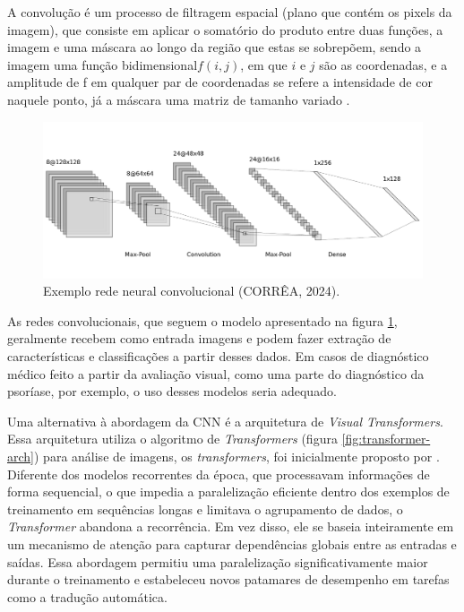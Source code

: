 A convolução é um processo de filtragem espacial (plano que contém os pixels da imagem), que consiste em aplicar o somatório do produto entre duas funções, a imagem e uma máscara ao longo da região que estas se sobrepõem, sendo a imagem uma função bidimensional\( f(i,j)\), em que \(i\) e \(j\) são as coordenadas, e a amplitude de f em qualquer par de coordenadas se refere a intensidade de cor naquele ponto, já a máscara uma matriz de tamanho variado \cite{gonzalez2008digital}. 

\begin{figure}[h]
    \centering
    \includegraphics[scale=0.3]{images/redeconv.png}
    \caption{Exemplo rede neural convolucional (CORRÊA, 2024).}
    \label{fig: cnn}
\end{figure}


As redes convolucionais, que seguem o modelo apresentado na figura \ref{fig: cnn}, geralmente recebem como entrada imagens e podem fazer extração de características e classificações a partir desses dados. Em casos de diagnóstico médico feito a partir da avaliação visual, como uma parte do diagnóstico da psoríase, por exemplo, o uso desses modelos seria adequado.

Uma alternativa à abordagem da \acs{CNN} é a arquitetura de \textit{Visual Transformers}. Essa arquitetura utiliza o algoritmo de \textit{Transformers} (figura \ref{fig:transformer-arch}) para análise de imagens, os \textit{transformers}, foi inicialmente proposto por \citeauthor{Vaswani}. Diferente dos modelos recorrentes da época, que processavam informações de forma sequencial, o que impedia a paralelização eficiente dentro dos exemplos de treinamento em sequências longas e limitava o agrupamento de dados, o \textit{Transformer} abandona a recorrência. Em vez disso, ele se baseia inteiramente em um mecanismo de atenção para capturar dependências globais entre as entradas e saídas. 
Essa abordagem permitiu uma paralelização significativamente maior durante o treinamento e estabeleceu novos patamares de desempenho em tarefas como a tradução automática.

